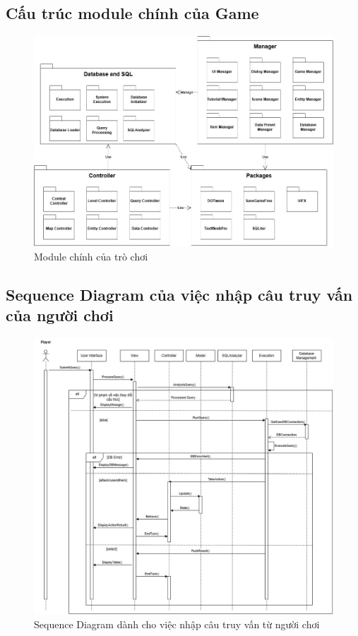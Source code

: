 \subsection{Cấu trúc module chính của Game}
\begin{figure}[H]
	\centering
	\includegraphics[width=\textwidth]{Images/Module.jpg}
	\vspace{0.5cm}
	\caption{Module chính của trò chơi}
\end{figure}
\subsection{Sequence Diagram của việc nhập câu truy vấn của người chơi}
\begin{figure}[H]
	\centering
	\includegraphics[width=\textwidth]{Images/seqQuery.jpg}
	\vspace{0.5cm}
	\caption{Sequence Diagram dành cho việc nhập câu truy vấn từ người chơi}
\end{figure}

